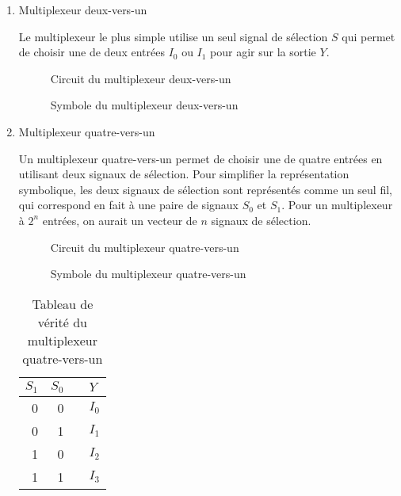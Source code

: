 \documentclass[letter, oneside]{book}
\begin{document}
\begin{enumerate}
\item Multiplexeur deux-vers-un
\label{sec:org80307d3}

Le multiplexeur le plus simple utilise un seul signal de sélection
\(S\) qui permet de choisir une de deux entrées \(I_0\) ou \(I_1\)
pour agir sur la sortie \(Y\).

\begin{figure}[htbp]
\centering

\caption{\label{fig:org9f16e8e}Circuit du multiplexeur deux-vers-un}
\end{figure}

\begin{figure}[htbp]
\centering

\caption{\label{fig:orgc507f20}Symbole du multiplexeur deux-vers-un}
\end{figure}

\item Multiplexeur quatre-vers-un
\label{sec:org7f28bfb}

Un multiplexeur quatre-vers-un permet de choisir une de quatre entrées
en utilisant deux signaux de sélection. Pour simplifier la
représentation symbolique, les deux signaux de sélection sont
représentés comme un seul fil, qui correspond en fait à une paire de
signaux \(S_0\) et \(S_1\). Pour un multiplexeur à \(2^n\) entrées, on
aurait un vecteur de \(n\) signaux de sélection.

\begin{figure}[htbp]
\centering

\caption{\label{fig:org9f4421c}Circuit du multiplexeur quatre-vers-un}
\end{figure}

\begin{figure}[htbp]
\centering

\caption{\label{fig:orge0e279e}Symbole du multiplexeur quatre-vers-un}
\end{figure}

\begin{table}[htbp]
\caption{\label{tab:org673083b}Tableau de vérité du multiplexeur quatre-vers-un}
\centering
\begin{tabular}{rrll}
\(S_1\) & \(S_0\) &  & \(Y\)\\[0pt]
\hline
0 & 0 &  & \(I_0\)\\[0pt]
0 & 1 &  & \(I_1\)\\[0pt]
1 & 0 &  & \(I_2\)\\[0pt]
1 & 1 &  & \(I_3\)\\[0pt]
\end{tabular}
\end{table}
\end{enumerate}
\end{document}
